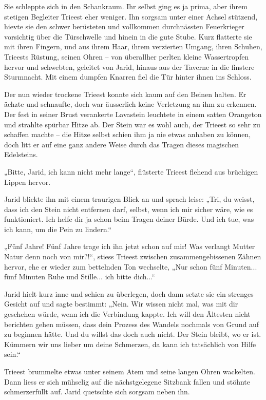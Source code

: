 \documentclass[10pt, a4paper, oneside]{book}
\begin{document}
Sie schleppte sich in den Schankraum. Ihr selbst ging es ja prima, aber ihrem stetigen Begleiter Trieest eher weniger. Ihn sorgsam unter einer Achsel stützend, hievte sie den schwer berüsteten und vollkommen durchnässten Feuerkrieger vorsichtig über die Türschwelle und hinein in die gute Stube. Kurz flatterte sie mit ihren Fingern, und aus ihrem Haar, ihrem verzierten Umgang, ihren Schuhen, Trieests Rüstung, seinen Ohren – von überallher perlten kleine Wassertropfen hervor und schwebten, geleitet von Jarid, hinaus aus der Taverne in die finstere Sturmnacht. Mit einem dumpfen Knarren fiel die Tür hinter ihnen ins Schloss.

Der nun wieder trockene Trieest konnte sich kaum auf den Beinen halten. Er ächzte und schnaufte, doch war äusserlich keine Verletzung an ihm zu erkennen. Der fest in seiner Brust verankerte Lavastein leuchtete in einem satten Orangeton und strahlte spürbar Hitze ab. Der Stein war es wohl auch, der Trieest so sehr zu schaffen machte – die Hitze selbst schien ihm ja nie etwas anhaben zu können, doch litt er auf eine ganz andere Weise durch das Tragen dieses magischen Edelsteins.\bigskip



„Bitte, Jarid, ich kann nicht mehr lange“, flüsterte Trieest flehend aus brüchigen Lippen hervor.

Jarid blickte ihn mit einem traurigen Blick an und sprach leise: „Tri, du weisst, dass ich den Stein nicht entfernen darf, selbst, wenn ich mir sicher wäre, wie es funktioniert. Ich helfe dir ja schon beim Tragen deiner Bürde. Und ich tue, was ich kann, um die Pein zu lindern.“

„Fünf Jahre! Fünf Jahre trage ich ihn jetzt schon auf mir! Was verlangt Mutter Natur denn noch von mir?!“, stiess Trieest zwischen zusammengebissenen Zähnen hervor, ehe er wieder zum bettelnden Ton wechselte, „Nur schon fünf Minuten... fünf Minuten Ruhe und Stille... ich bitte dich...“

Jarid hielt kurz inne und schien zu überlegen, doch dann setzte sie ein strenges Gesicht auf und sagte bestimmt: „Nein. Wir wissen nicht mal, was mit dir geschehen würde, wenn ich die Verbindung kappte. Ich will den Ältesten nicht berichten gehen müssen, dass dein Prozess des Wandels nochmals von Grund auf zu beginnen hätte. Und du willst das doch auch nicht. Der Stein bleibt, wo er ist. Kümmern wir uns lieber um deine Schmerzen, da kann ich tatsächlich von Hilfe sein.“

Trieest brummelte etwas unter seinem Atem und seine langen Ohren wackelten. Dann liess er sich mühselig auf die nächstgelegene Sitzbank fallen und stöhnte schmerzerfüllt auf. Jarid quetschte sich sorgsam neben ihn.
\end{document}
